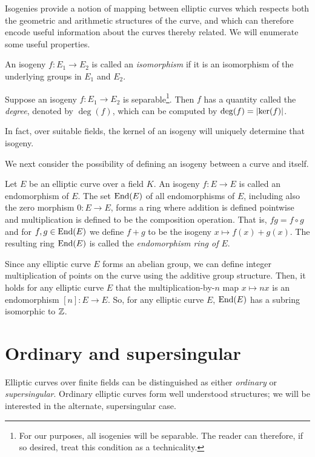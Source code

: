         Isogenies provide a notion of mapping between elliptic curves which respects both the geometric and arithmetic structures of the curve, and which can therefore encode useful information about the curves thereby related. We will enumerate some useful properties.

        \begin{definition}
            An isogeny $f \colon E_1 \to E_2$ is called an \textit{isomorphism} if it is an isomorphism of the underlying groups in $E_1$ and $E_2$.
        \end{definition}

        \begin{definition}
            Suppose an isogeny $f \colon E_1 \to E_2$ is separable\footnote{For our purposes, all isogenies will be separable. The reader can therefore, if so desired, treat this condition as a technicality.}. Then $f$ has a quantity called the \textit{degree}, denoted by $\deg(f)$, which can be computed by $\deg(f) = \left\lvert\ker(f)\right\rvert$.
        \end{definition}

        In fact, over suitable fields, the kernel of an isogeny will uniquely determine that isogeny. 

        We next consider the possibility of defining an isogeny between a curve and itself.

        \begin{definition}
            Let $E$ be an elliptic curve over a field $K$. An isogeny $f \colon E \to E$ is called an endomorphism of $E$. The set $\mathrm{End}(E)$ of all endomorphisms of $E$, including also the zero morphism $0 \colon E \to E$, forms a ring where addition is defined pointwise and multiplication is defined to be the composition operation. That is, $fg = f \circ g$ and for $f,g \in \mathrm{End}(E)$ we define $f + g$ to be the isogeny $x \mapsto f(x) + g(x)$. The resulting ring $\mathrm{End}(E)$ is called the \textit{endomorphism ring of $E$}.
        \end{definition}

        Since any elliptic curve $E$ forms an abelian group, we can define integer multiplication of points on the curve using the additive group structure. Then, it holds for any elliptic curve $E$ that the multiplication-by-$n$ map $x \mapsto nx$ is an endomorphism $[n] \colon E \to E$. So, for any elliptic curve $E$, $\mathrm{End}(E)$ has a subring isomorphic to $\mathbb{Z}$.

    \section{Ordinary and supersingular}
        Elliptic curves over finite fields can be distinguished as either \textit{ordinary} or \textit{supersingular}. Ordinary elliptic curves form well understood structures; we will be interested in the alternate, supersingular case.

